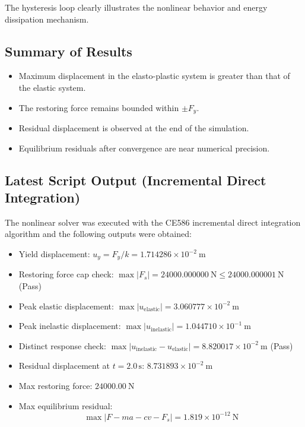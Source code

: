 The hysteresis loop clearly illustrates the nonlinear behavior and energy dissipation mechanism.



\subsection{Summary of Results}

\begin{itemize}
\item Maximum displacement in the elasto-plastic system is greater than that of the elastic system.
\item The restoring force remains bounded within $\pm F_y$.
\item Residual displacement is observed at the end of the simulation.
\item Equilibrium residuals after convergence are near numerical precision.
\end{itemize}

\subsection{Latest Script Output (Incremental Direct Integration)}

The nonlinear solver was executed with the CE586 incremental direct integration algorithm and the following outputs were obtained:

\begin{itemize}
\item Yield displacement: $u_y = F_y/k = 1.714286 \times 10^{-2}\ \mathrm{m}$
\item Restoring force cap check: $\max |F_s| = 24000.000000\ \mathrm{N} \le 24000.000001\ \mathrm{N}$ (Pass)
\item Peak elastic displacement: $\max |u_{\mathrm{elastic}}| = 3.060777 \times 10^{-2}\ \mathrm{m}$
\item Peak inelastic displacement: $\max |u_{\mathrm{inelastic}}| = 1.044710 \times 10^{-1}\ \mathrm{m}$
\item Distinct response check: $\max |u_{\mathrm{inelastic}}-u_{\mathrm{elastic}}| = 8.820017 \times 10^{-2}\ \mathrm{m}$ (Pass)
\item Residual displacement at $t=2.0\,\mathrm{s}$: $8.731893 \times 10^{-2}\ \mathrm{m}$
\item Max restoring force: $24000.00\ \mathrm{N}$
\item Max equilibrium residual:
$$\max |F - m a - c v - F_s| = 1.819 \times 10^{-12}\ \mathrm{N}$$
\end{itemize}